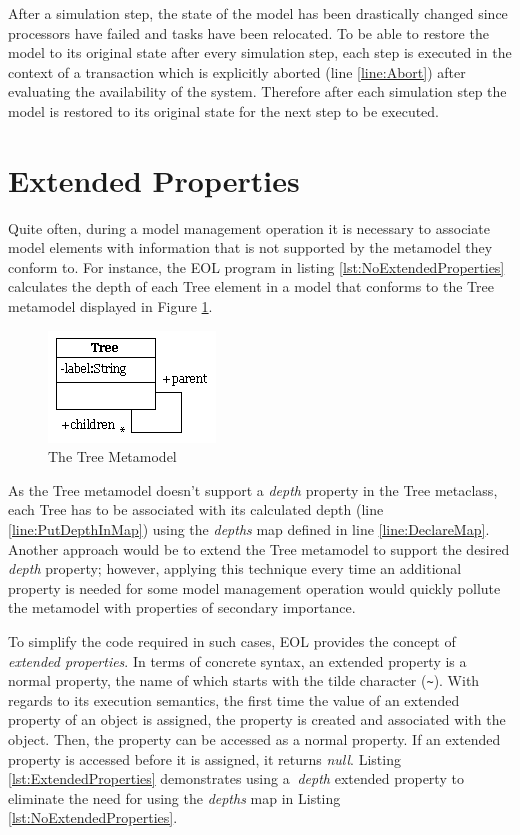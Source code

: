 After a simulation step, the state of the model has been drastically changed since processors have failed and tasks have been relocated. To be able to restore the model to its original state after every simulation step, each step is executed in the context of a transaction which is explicitly aborted (line \ref{line:Abort}) after evaluating the availability of the system. Therefore after each simulation step the model is restored to its original state for the next step to be executed.



\section{Extended Properties}
\label{sec:ExtendedProperties}

Quite often, during a model management operation it is necessary to associate model elements with information that is not supported by the metamodel they conform to. For instance, the EOL program in listing \ref{lst:NoExtendedProperties} calculates the depth of each Tree element in a model that conforms to the Tree metamodel displayed in Figure \ref{fig:Tree1}.

\begin{figure}[t!]
	\centering
		\includegraphics{images/metamodels/Tree.png}
	\caption{The Tree Metamodel}
	\label{fig:Tree1}
\end{figure}

As the Tree metamodel doesn't support a \emph{depth} property in the Tree metaclass, each Tree has to be associated with its calculated depth (line \ref{line:PutDepthInMap}) using the \emph{depths} map defined in line \ref{line:DeclareMap}. Another approach would be to extend the Tree metamodel to support the desired \emph{depth} property; however, applying this technique every time an additional property is needed for some model management operation would quickly pollute the metamodel with properties of secondary importance.

To simplify the code required in such cases, EOL provides the concept of \emph{extended properties}. In terms of concrete syntax, an extended property is a normal property, the name of which starts with the tilde character (\verb|~|). With regards to its execution semantics, the first time the value of an extended property of an object is assigned, the property is created and associated with the object. Then, the property can be accessed as a normal property. If an extended property is accessed before it is assigned, it returns \emph{null}. Listing \ref{lst:ExtendedProperties} demonstrates using a $~$\emph{depth} extended property to eliminate the need for using the \emph{depths} map in Listing \ref{lst:NoExtendedProperties}.

